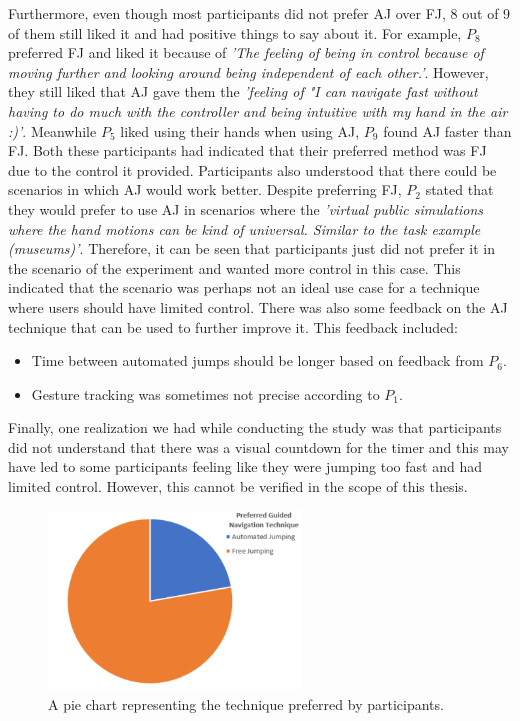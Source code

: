 Furthermore, even though most participants did not prefer AJ over FJ, 8 out of 9 of them still liked it and had positive things to say about it. For example, $P_8$ preferred FJ and liked it because of \textit{'The feeling of being in control because of moving further and looking around being independent of each other.'}. However, they still liked that AJ gave them the \textit{'feeling of "I can navigate fast without having to do much with the controller and being intuitive with my hand in the air :)'}. Meanwhile $P_5$ liked using their hands when using AJ, $P_9$ found AJ faster than FJ. Both these participants had indicated that their preferred method was FJ due to the control it provided. Participants also understood that there could be scenarios in which AJ would work better. Despite preferring FJ, $P_2$ stated that they would prefer to use AJ in scenarios where the \textit{'virtual public simulations where the hand motions can be kind of universal. Similar to the task example (museums)'}. Therefore, it can be seen that participants just did not prefer it in the scenario of the experiment and wanted more control in this case. This indicated that the scenario was perhaps not an ideal use case for a technique where users should have limited control. There was also some feedback on the AJ technique that can be used to further improve it. This feedback included:
\begin{itemize}
	\item Time between automated jumps should be longer based on feedback from $P_6$.
	\item Gesture tracking was sometimes not precise according to $P_1$.
\end{itemize}

Finally, one realization we had while conducting the study was that participants did not understand that there was a visual countdown for the timer and this may have led to some participants feeling like they were jumping too fast and had limited control. However, this cannot be verified in the scope of this thesis.

\begin{figure}[]
	\centering
	\includegraphics[width=0.6\textwidth]{images/comparison-chart.pdf}
	\caption{A pie chart representing the technique preferred by participants.}
	\label{fig:comparison}
\end{figure}
